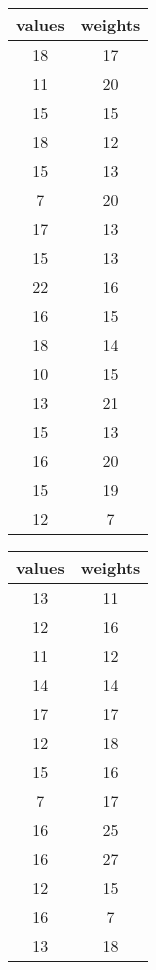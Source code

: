 \begin{table}[H]
\centering
    \begin{tabular}{cc}
        \toprule
        \toprule
        values & weights \\
        \midrule
        18     & 17      \\
        11     & 20      \\
        15     & 15      \\
        18     & 12      \\
        15     & 13      \\
        7      & 20      \\
        17     & 13      \\
        15     & 13      \\
        22     & 16      \\
        16     & 15      \\
        18     & 14      \\
        10     & 15      \\
        13     & 21      \\
        15     & 13      \\
        16     & 20      \\
        15     & 19      \\
        12     & 7       \\
                \bottomrule
    \end{tabular}
    \hspace{5pt}
    \begin{tabular}{cc}
        \toprule
        \toprule
        values & weights \\
        \midrule
        13     & 11      \\
        12     & 16      \\
        11     & 12      \\
        14     & 14      \\
        17     & 17      \\
        12     & 18      \\
        15     & 16      \\
        7      & 17      \\
        16     & 25      \\
        16     & 27      \\
        12     & 15      \\
        16     & 7       \\
        13     & 18      \\

\end{tabular}
\end{table}
